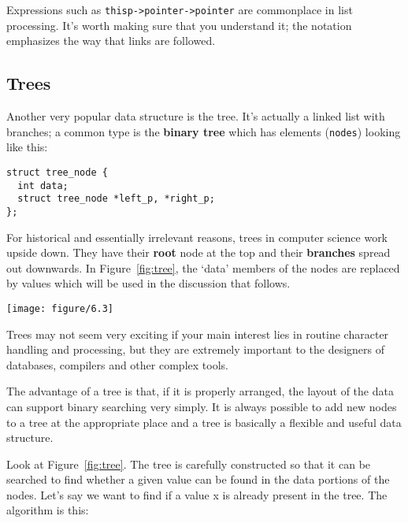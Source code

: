    Expressions such as \texttt{thisp->pointer->pointer} are
    commonplace in list processing. It's worth making sure that you understand
    it; the notation emphasizes the way that links are followed.


  

  \subsection{Trees}
   

   Another very popular data structure is the tree. It's actually a linked
    list with branches; a common type is the \textbf{binary tree} which has
    elements (\texttt{nodes}) looking like this:


   \begin{Verbatim}
struct tree_node {
  int data;
  struct tree_node *left_p, *right_p;
};
\end{Verbatim}

   For historical and essentially irrelevant reasons, trees in computer
    science work upside down. They have their \textbf{root} node at the top
    and their \textbf{branches} spread out downwards.
    In Figure~\ref{fig:tree},
    the `data' members of the nodes are replaced by values
    which will be used in the discussion that follows.


    \begin{figure*}[htb]\centering
      \texttt{[image: figure/6.3]}
      \caption*{A tree structure, made up of 7 items,
        each of which is labelled with a different number.
        Each item has two pointer values, labelled 'left\_p' and 'right\_p',
        which point to child items.
        One item is labelled 'root'
        and isn't a child of any of the other  items.}
      \caption{\label{fig:tree}A tree}
    \end{figure*}



   Trees may not seem very exciting if your main interest lies in routine
    character handling and processing, but they are extremely important to the
    designers of databases, compilers and other complex tools.


   The advantage of a tree is that, if it is properly arranged, the layout
    of the data can support binary searching very simply. It is always possible
    to add new nodes to a tree at the appropriate place and a tree is basically
    a flexible and useful data structure.


   Look at Figure~\ref{fig:tree}. The tree is carefully constructed so
    that it can be searched to find whether a given value can be found in the
    data portions of the nodes. Let's say we want to find if a value
    x is already present in the tree. The algorithm is this:


